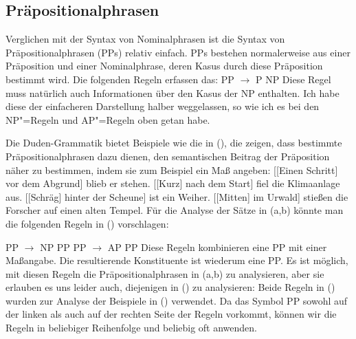\subsection{Präpositionalphrasen}
\label{Abschnitt-PP-Syntax}

Verglichen mit der Syntax von Nominalphrasen ist die Syntax von Präpositionalphrasen (PPs) relativ einfach. PPs bestehen normalerweise
aus einer Präposition und einer Nominalphrase, deren Kasus durch diese Präposition bestimmt
wird. Die folgenden Regeln erfassen das:
\ea
\label{Regel-PP-einfach}
PP $\to$ P NP
\z
Diese Regel muss natürlich auch Informationen über den Kasus der NP enthalten. Ich habe diese der einfacheren Darstellung halber weggelassen, so wie ich es
bei den NP"=Regeln und AP"=Regeln oben getan habe.

Die Duden-Grammatik \citep[§~1300]{Duden2005-Authors} bietet Beispiele wie die in (), die zeigen, dass bestimmte Präpositionalphrasen
dazu dienen, den semantischen Beitrag der Präposition näher zu bestimmen, indem sie zum Beispiel ein Maß angeben:
\eal
\ex\label{Beispiel-Schritt-vor-dem-Abgrund}
{}[[Einen Schritt] vor dem Abgrund] blieb er stehen.
\ex
{}[[Kurz] nach dem Start] fiel die Klimaanlage aus.
\ex
{}[[Schräg] hinter der Scheune] ist ein Weiher.
\ex
{}[[Mitten] im Urwald] stießen die Forscher auf einen alten Tempel.
\zl
Für die Analyse der Sätze in (a,b) könnte man die folgenden Regeln in () vorschlagen:

\eal
\ex PP $\to$ NP PP
\ex PP $\to$ AP PP
\zl
Diese Regeln kombinieren eine PP mit einer Maßangabe. Die resultierende Konstituente ist wiederum eine PP. Es ist
möglich, mit diesen Regeln die Präpositionalphrasen in (a,b) zu analysieren, aber sie erlauben es uns leider auch,
diejenigen in () zu analysieren:
\eal
{}
\zl
Beide Regeln in () wurden zur Analyse der Beispiele in () verwendet. Da das Symbol PP sowohl auf der linken
als auch auf der rechten Seite der Regeln vorkommt, können wir die Regeln in beliebiger Reihenfolge und beliebig oft anwenden.

